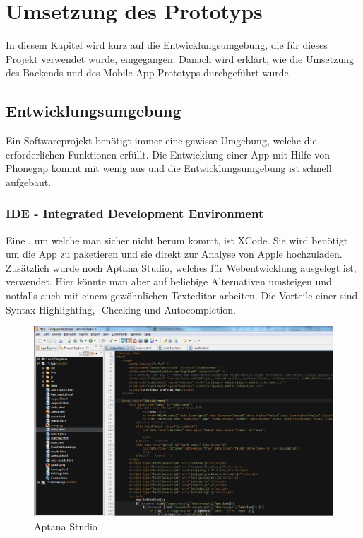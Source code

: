 %
%

\chapter{Umsetzung des Prototyps}\label{chap.umsetzung}
In diesem Kapitel wird kurz auf die Entwicklungsumgebung, die für dieses Projekt verwendet wurde, eingegangen. Danach wird erklärt, wie die Umsetzung des Backends und des Mobile App Prototyps durchgeführt wurde.

\section{Entwicklungsumgebung}\label{entwicklungsumgebung}
Ein Softwareprojekt benötigt immer eine gewisse Umgebung, welche die erforderlichen Funktionen erfüllt. Die Entwicklung einer App mit Hilfe von Phonegap kommt mit wenig aus und die Entwicklungsumgebung ist schnell aufgebaut.

\subsection{IDE - Integrated Development Environment}
Eine , um welche man sicher nicht herum kommt, ist XCode. Sie wird benötigt um die App zu paketieren und sie direkt zur Analyse von Apple hochzuladen. Zusätzlich wurde noch Aptana Studio, welches für Webentwicklung ausgelegt ist, verwendet. Hier könnte man aber auf beliebige Alternativen umsteigen und notfalls auch mit einem gewöhnlichen Texteditor arbeiten. Die Vorteile einer  sind Syntax-Highlighting, -Checking und Autocompletion.

\begin{figure}[h]
\centering
\includegraphics[scale=0.5]{images/aptana.png}
\caption{Aptana Studio}
\label{fig:aptana}
\end{figure}


